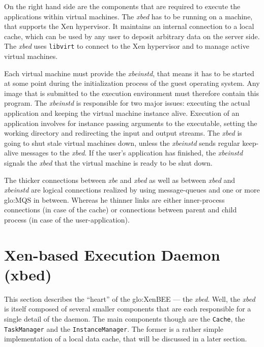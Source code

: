 \medskip

On the right hand side are the components that are required to execute the
applications within  virtual machines.  The \emph{xbed} has  to be running
on a machine, that supports  the Xen hypervisor.  It maintains an internal
connection to  a local  cache, which can  be used  by any user  to deposit
arbitrary data on the  server side.  The \emph{xbed} uses \texttt{libvirt}
to connect to the Xen hypervisor and to manage active virtual machines.

Each virtual machine  must provide the \emph{xbeinstd}, that  means it has
to be started at some point during the initialization process of the guest
operating system. Any image that is submitted to the execution environment
must therefore  contain this  program. The \emph{xbeinstd}  is responsible
for two  major issues:  executing the actual  application and  keeping the
virtual machine instance alive.   Execution of an application involves for
instance  passing  arguments  to   the  executable,  setting  the  working
directory and redirecting the input and output streams. The \emph{xbed} is
going  to shut  stale virtual  machines down,  unless  the \emph{xbeinstd}
sends  regular keep-alive  messages  to the  \emph{xbed}.   If the  user's
application has finished, the \emph{xbeinstd} signals the \emph{xbed} that
the virtual machine is ready to be shut down.

\medskip

The  thicker connections  between \emph{xbe}  and \emph{xbed}  as  well as
between \emph{xbed}  and \emph{xbeinstd} are  logical connections realized
by using message-queues and one  or more \gls{glo:MQS} in between. Whereas
he  thinner links  are either  inner-process connections  (in case  of the
cache) or  connections between  parent and child  process (in case  of the
user-application).

\section[Xen-based Execution Daemon]{Xen-based Execution Daemon (xbed)}
\label{sec:xbed}

This  section describes  the  ``heart'' of  the  \gls{glo:XenBEE} ---  the
\emph{xbed}.  Well, the \emph{xbed}  is itself composed of several smaller
components that  are each responsible for  a single detail  of the daemon.
The    main    components    though    are   the    \texttt{Cache},    the
\texttt{TaskManager}  and the  \texttt{InstanceManager}. The  former  is a
rather simple implementation of a local data cache, that will be discussed
in a later section.

